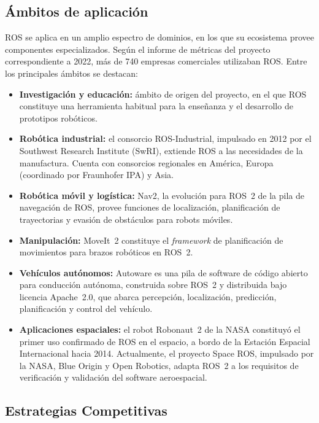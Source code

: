 \subsection{Ámbitos de aplicación}

ROS se aplica en un amplio espectro de dominios, en los que su ecosistema
provee componentes especializados. Según el informe de métricas del proyecto
correspondiente a 2022, más de 740 empresas comerciales utilizaban ROS. Entre
los principales ámbitos se destacan:
\begin{itemize}
    \item \textbf{Investigación y educación:} ámbito de origen del proyecto,
    en el que ROS constituye una herramienta habitual para la enseñanza y el
    desarrollo de prototipos robóticos.
    \item \textbf{Robótica industrial:} el consorcio ROS-Industrial, impulsado
    en 2012 por el Southwest Research Institute (SwRI), extiende ROS a las
    necesidades de la manufactura. Cuenta con consorcios regionales en
    América, Europa (coordinado por Fraunhofer IPA) y Asia.
    \item \textbf{Robótica móvil y logística:} Nav2, la evolución para ROS~2
    de la pila de navegación de ROS, provee funciones de localización,
    planificación de trayectorias y evasión de obstáculos para robots móviles.
    \item \textbf{Manipulación:} MoveIt~2 constituye el \textit{framework} de
    planificación de movimientos para brazos robóticos en ROS~2.
    \item \textbf{Vehículos autónomos:} Autoware es una pila de software de
    código abierto para conducción autónoma, construida sobre ROS~2 y
    distribuida bajo licencia Apache~2.0, que abarca percepción, localización,
    predicción, planificación y control del vehículo.
    \item \textbf{Aplicaciones espaciales:} el robot Robonaut~2 de la NASA
    constituyó el primer uso confirmado de ROS en el espacio, a bordo de la
    Estación Espacial Internacional hacia 2014. Actualmente, el proyecto Space
    ROS, impulsado por la NASA, Blue Origin y Open Robotics, adapta ROS~2 a los
    requisitos de verificación y validación del software aeroespacial.
\end{itemize}

\subsection{Estrategias Competitivas}

